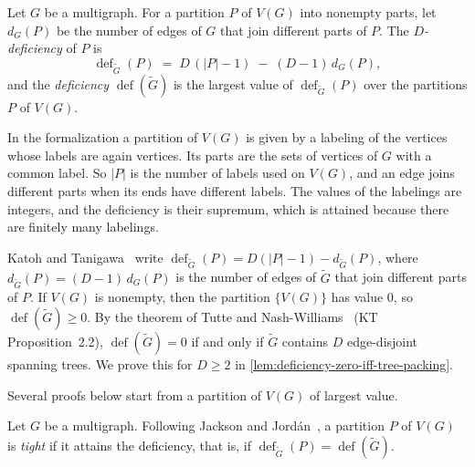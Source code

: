 \begin{definition}
  \label{def:D-deficiency}
  \leanok
  Let $G$ be a multigraph. For a partition $P$ of $V(G)$ into nonempty
  parts, let $d_G(P)$ be the number of edges of $G$ that join different
  parts of $P$. The \emph{$D$-deficiency} of $P$ is
  \[
    \operatorname{def}_{\tilde G}(P) \;=\; D\,(|P| - 1) \;-\;
      (D-1)\,d_G(P),
  \]
  and the \emph{deficiency} $\operatorname{def}(\tilde G)$ is the
  largest value of $\operatorname{def}_{\tilde G}(P)$ over the
  partitions $P$ of $V(G)$.
\end{definition}
\begin{fmlnote}
  \label{fmlnote:partition-labeling}
  In the formalization a partition of $V(G)$ is given by a labeling of
  the vertices whose labels are again vertices. Its parts are the sets
  of vertices of $G$ with a common label. So $|P|$ is the number of
  labels used on $V(G)$, and an edge joins different parts when its
  ends have different labels. The values of the labelings are integers,
  and the deficiency is their supremum, which is attained because there
  are finitely many labelings.
\end{fmlnote}

Katoh and Tanigawa~\cite[p.~655]{katohTanigawa2011} write
$\operatorname{def}_{\tilde G}(P) = D(|P| - 1) - d_{\tilde G}(P)$, where
$d_{\tilde G}(P) = (D-1)\,d_G(P)$ is the number of edges of $\tilde G$
that join different parts of $P$. If $V(G)$ is nonempty, then the partition $\{V(G)\}$ has value $0$, so
$\operatorname{def}(\tilde G) \ge 0$. By the theorem of Tutte and
Nash-Williams~\cite{tutte1961,nashWilliams1961} (KT
Proposition~2.2), $\operatorname{def}(\tilde G) = 0$ if and only if
$\tilde G$ contains $D$ edge-disjoint spanning trees. We prove this for
$D \ge 2$ in \cref{lem:deficiency-zero-iff-tree-packing}.

Several proofs below start from a partition of $V(G)$ of largest value.

\begin{definition}
  \label{def:tight-partition}
  \leanok
  Let $G$ be a multigraph. Following Jackson and
  Jord\'an~\cite[\S2]{jacksonJordan2008}, a partition $P$ of $V(G)$
  is \emph{tight} if it attains the deficiency, that is, if
  $\operatorname{def}_{\tilde G}(P) = \operatorname{def}(\tilde G)$.
\end{definition}

